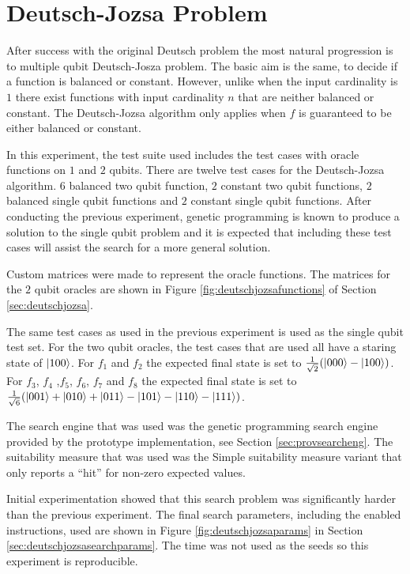 \section{Deutsch-Jozsa Problem}
\label{sec:deutschjozsaexperiment}

After success with the original Deutsch problem the most natural progression is to multiple qubit Deutsch-Josza problem.
The basic aim is the same, to decide if a function is balanced or constant.
However, unlike when the input cardinality is $1$ there exist functions with input cardinality $n$ that are neither balanced or constant.
The Deutsch-Jozsa algorithm only applies when $f$ is guaranteed to be either balanced or constant.

In this experiment, the test suite used includes the test cases with oracle functions on $1$ and $2$ qubits.
There are twelve test cases for the Deutsch-Jozsa algorithm.
$6$ balanced two qubit function, $2$ constant two qubit functions, $2$ balanced single qubit functions and $2$ constant single qubit functions.
After conducting the previous experiment, genetic programming is known to produce a solution to the single qubit problem and it is expected that including these test cases will assist the search for a more general solution.

Custom matrices were made to represent the oracle functions.
The matrices for the $2$ qubit oracles are shown in Figure \ref{fig:deutschjozsafunctions} of Section \ref{sec:deutschjozsa}.

The same test cases as used in the previous experiment is used as the single qubit test set.
For the two qubit oracles, the test cases that are used all have a staring state of $\left\vert{100}\right\rangle$.
For $f_1$ and $f_2$ the expected final state is set to $\frac{1}{\sqrt{2}}(\left\vert{000}\right\rangle-\left\vert{100}\right\rangle)$.
For $f_3$, $f_4$ ,$f_5$, $f_6$, $f_7$ and $f_8$ the expected final state is set to $\frac{1}{\sqrt{6}}(\left\vert{001}\right\rangle+\left\vert{010}\right\rangle+\left\vert{011}\right\rangle-\left\vert{101}\right\rangle-\left\vert{110}\right\rangle-\left\vert{111}\right\rangle)$.

The search engine that was used was the genetic programming search engine provided by the prototype implementation, see Section \ref{sec:provsearcheng}.
The suitability measure that was used was the Simple suitability measure variant that only reports a ``hit'' for non-zero expected values.

Initial experimentation showed that this search problem was significantly harder than the previous experiment.
The final search parameters, including the enabled instructions, used are shown in Figure \ref{fig:deutschjozsaparams} in Section \ref{sec:deutschjozsasearchparams}.
The time was not used as the seeds so this experiment is reproducible.

